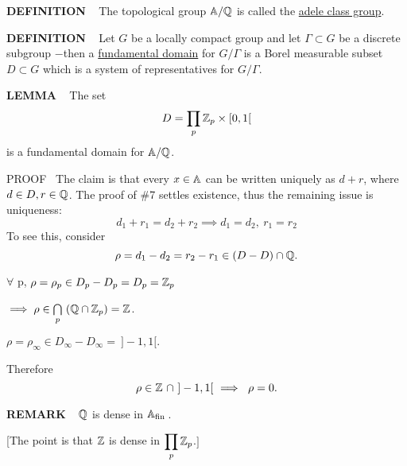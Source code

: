 \vspace{0.1cm}



\begin{x}{\small\bf DEFINITION} \ %
The topological group $\mathbb{A}/\mathbb{Q}$ is called the 
\underline{adele class group}.
\end{x}

\vspace{0.1cm}



\begin{x}{\small\bf DEFINITION} \ %
Let $G$ be a locally compact group and let $\Gamma \subset G$ be a discrete subgroup $-$then a 
\underline{fundamental domain}
for $G/\Gamma$ is a Borel measurable subset $D \subset G$ which is a system of representatives for $G/\Gamma$.
\end{x}

\vspace{0.1cm}



\begin{x}{\small\bf LEMMA} \ %
The set
\[
D = \prod\limits_p \mathbb{Z}_p \times [0,1[
\]
is a fundamental domain for $\mathbb{A}/\mathbb{Q}$.

\vspace{0.1cm}

PROOF \  
The claim is that every $x \in \mathbb{A}$ can be written uniquely as $d + r$, where $d \in D, r \in \mathbb{Q}$.  
The proof of \#7 settles existence, thus the remaining issue is uniqueness:
\[
d_1 + r_1 = d_2 + r_2 \implies d_1 = d_2,\  r_1 = r_2
\]
To see this, consider
\[
\rho = d_1 - d_2 = r_2 - r_1 \in (D-D) \cap \mathbb{Q}.
\]

\qquad\qquad \textbullet \quad $\forall$ p, $\rho = \rho_p \in D_p - D_p = D_p = \mathbb{Z}_p$ 

\qquad\qquad\qquad $\implies \rho \in \bigcap\limits_p \ (\mathbb{Q} \cap \mathbb{Z}_p) = \mathbb{Z}$.

\qquad\qquad \textbullet \quad $\rho = \rho_\infty \in D_\infty - D_\infty = \  ]-1,1[.$

Therefore
\[
\rho \in  \mathbb{Z} \  \cap \   ]-1,1[ \   \implies \   \rho = 0.
\]
\end{x}

\vspace{0.1cm}


\begin{x}{\small\bf REMARK} \ %
$\mathbb{Q}$ is dense in $\mathbb{A}_\text{fin}\hspace{0.05cm}$.

\vspace{0.1cm}

[The point is that $\mathbb{Z}$ is dense in $\displaystyle\prod\limits_p \mathbb{Z}_p$.$]$
\end{x}

